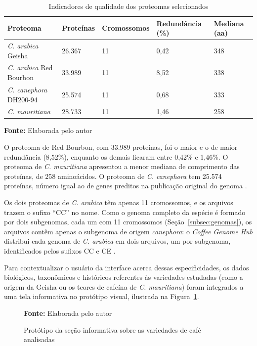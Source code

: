 \FloatBarrier
\begin{table}[!htbp]
	\centering
	\SingleSpacing\small
	\caption{Indicadores de qualidade dos proteomas selecionados}
	\begin{tabularx}{\textwidth}{@{}lYYYY@{}}
		\toprule
		\textbf{Proteoma} & \textbf{Proteínas} & \textbf{Cromossomos} & \textbf{Redundância (\%)} & \textbf{Mediana (aa)} \\
		\midrule
		\textit{C. arabica} Geisha      & 26.367 & 11 & 0,42 & 348 \\
		\textit{C. arabica} Red Bourbon & 33.989 & 11 & 8,52 & 338 \\
		\textit{C. canephora} DH200-94  & 25.574 & 11 & 0,68 & 333 \\
		\textit{C. mauritiana}          & 28.733 & 11 & 1,46 & 258 \\
		\bottomrule
	\end{tabularx}
	\par\vspace{0.2cm}
	\textbf{Fonte:} Elaborada pelo autor
	\label{tab:qualidade}
\end{table}
\FloatBarrier

O proteoma de Red Bourbon, com 33.989 proteínas, foi o maior e o de maior redundância (8,52\%), enquanto os demais ficaram entre 0,42\% e 1,46\%. O proteoma de \textit{C. mauritiana} apresentou a menor mediana de comprimento das proteínas, de 258 aminoácidos. O proteoma de \textit{C. canephora} tem 25.574 proteínas, número igual ao de genes preditos na publicação original do genoma \cite{Denoeud2014}.

Os dois proteomas de \textit{C. arabica} têm apenas 11 cromossomos, e os arquivos trazem o sufixo ``CC'' no nome. Como o genoma completo da espécie é formado por dois subgenomas, cada um com 11 cromossomos (Seção~\ref{subsec:genomas}), os arquivos contêm apenas o subgenoma de origem \textit{canephora}: o \textit{Coffee Genome Hub} distribui cada genoma de \textit{C. arabica} em dois arquivos, um por subgenoma, identificados pelos sufixos CC e CE \cite{CoffeeHub}.

Para contextualizar o usuário da interface acerca dessas especificidades, os dados biológicos, taxonômicos e históricos referentes às variedades estudadas (como a origem da Geisha ou os teores de cafeína de \textit{C. mauritiana}) foram integrados a uma tela informativa no protótipo visual, ilustrada na Figura~\ref{fig:tela_historia}.



\begin{figure}[!htbp]
	\centering
	\vspace{1.0cm}
	
	
	\vspace{1.0cm}
	\caption{Protótipo da seção informativa sobre as variedades de café analisadas}
	\label{fig:tela_historia}
	\par\vspace{0.2cm}
	\textbf{Fonte:} Elaborada pelo autor
\end{figure}
\FloatBarrier




